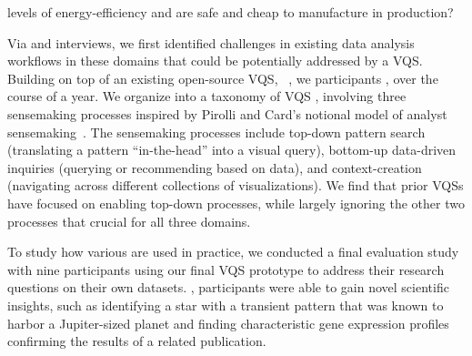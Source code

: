 levels of energy-efficiency and are safe and
cheap to manufacture in production?
\par Via  and interviews, we first identified challenges in existing data analysis workflows in these domains
that could be potentially addressed by a VQS. Building on top of an existing open-source VQS, \zv~\cite{Siddiqui2017,Siddiqui2017VLDB}, we  participants , over the course of a year. We organize  into a taxonomy of VQS , involving three sensemaking processes inspired by Pirolli and Card's notional model of analyst sensemaking~\cite{Pirolli}. The sensemaking processes include top-down pattern search (translating a pattern ``in-the-head'' into a visual query), bottom-up data-driven inquiries (querying or recommending based on data), and context-creation (navigating across different collections of visualizations). We find that prior VQSs have focused on enabling top-down processes, while largely ignoring the other two processes that  crucial for all three domains.
\par To study how various  are used in practice,
we conducted a final evaluation study with nine participants
using our final VQS prototype to address their research questions
on their own datasets.
, participants were able to
gain novel scientific insights,
such as identifying a star with a transient pattern
that was known to harbor a Jupiter-sized planet
and finding characteristic gene expression profiles confirming the results of a related publication. 


